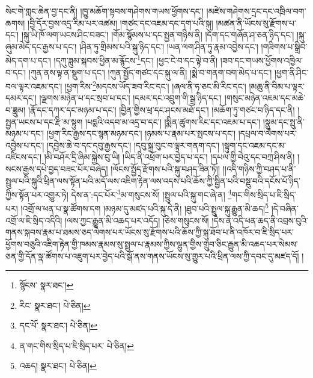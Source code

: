 སེང་གེ་གླང་ཆེན་བྱ་དང་ནི། །ཁྱུ་མཆོག་སྟབས་གཤེགས་གཡས་ཕྱོགས་དང་། །མཛེས་གཤེགས་དྲང་དང་འཁྲིལ་བག་ཆགས། །བྱི་དོར་བྱས་འདྲ་རིམ་པར་འཚམ། །གཙང་དང་འཇམ་དང་དག་པའི་སྐུ། །མཚན་ནི་ཡོངས་སུ་རྫོགས་པ་དང་། །སྐུ་ཡི་ཁོ་ལག་ཡངས་ཤིང་བཟང་། །གོམ་སྙོམས་པ་དང་སྤྱན་གཉིས་ནི། །དག་དང་གཞོན་ཤ་ཅན་ཉིད་དང་། །སྐུ་ཞུམ་མེད་དང་རྒྱས་པ་དང་། །ཤིན་ཏུ་གྲིམས་པའི་སྐུ་ཉིད་དང་། །ཡན་ལག་ཤིན་ཏུ་རྣམ་འབྱེས་དང་། །གཟིགས་པ་སྒྲིབ་མེད་དག་པ་དང་། །དཀུ་ཟླུམ་སྐབས་ཕྱིན་མ་རྙོངས་\footnote{སྙོངས་  སྣར་ཐང་། }དང་། །ཕྱང་ངེ་བ་དང་ལྟེ་བ་ནི། །ཟབ་དང་གཡས་ཕྱོགས་འཁྱིལ་བ་དང་། །ཀུན་ནས་ལྟ་ན་སྡུག་པ་དང་། །ཀུན་སྤྱོད་གཙང་དང་སྐུ་ལ་ནི། །སྨེ་བ་གནག་བག་མེད་པ་དང་། །ཕྱག་ནི་ཤིང་བལ་ལྟར་འཇམ་དང་། །ཕྱག་རིས་\footnote{རིང་  སྣར་ཐང་།  པེ་ཅིན། }མདངས་ཡོད་ཟབ་རིང་དང་། །ཞལ་ནི་ཧ་ཅང་མི་རིང་དང་། །མཆུ་ནི་བིམ་པ་ལྟར་དམར་དང་། །ལྗགས་མཉེན་པ་དང་སྲབ་པ་དང་། །དམར་དང་འབྲུག་གི་སྒྲ་ཉིད་དང་། །གསུང་མཉེན་འཇམ་དང་མཆེ་བ་ཟླུམ། །རྣོ་དང་དཀར་དང་མཉམ་པ་དང་། །བྱིན་གྱིས་ཕྲ་དང་ཤངས་མཐོ་དང་། །མཆོག་ཏུ་གཙང་བ་ཉིད་དང་ནི། །སྤྱན་ཡངས་པ་དང་རྫི་མ་སྟུག །པདྨའི་འདབ་མ་འདྲ་བ་དང་། །སྨིན་ཚུགས་རིང་དང་འཇམ་པ་དང་། །སྣུམ་དང་སྤུ་ནི་མཉམ་པ་དང་། །ཕྱག་རིང་རྒྱས་དང་སྙན་མཉམ་དང་། །ཉམས་པ་རྣམ་པར་སྤངས་པ་དང་། །དཔྲལ་བ་ལེགས་པར་འབྱེས་པ་དང་། །དབྱེས་ཆེ་བ་དང་དབུ་རྒྱས་དང་། །དབུ་སྐྲ་བུང་བ་ལྟར་གནག་དང་། །སྟུག་དང་འཇམ་དང་མ་འཛིངས་དང་། །མི་བཤོར་དྲི་ཞིམ་སྐྱེས་བུ་ཡི། །ཡིད་ནི་འཕྲོག་པར་བྱེད་པ་དང་། །དཔལ་གྱི་བེའུ་དང་བཀྲ་ཤིས་ནི། །སངས་རྒྱས་དཔེ་བྱད་བཟང་པོར་བཞེད། །ལོངས་སྤྱོད་རྫོགས་པའི་སྐུ་བཤད་ཟིན་ཏོ།། །།འདི་གཉིས་ཀྱི་བཤད་པ་ནི་སྤྲུལ་པའི་སྐུའི་ཕྲིན་ལས་སྟོན་པའི་མདོ་ལས་འཇིག་རྟེན་ལས་འདས་པའི་ཆོས་ཀྱི་སྦྱིན་པའི་བསྡུ་བའི་དངོས་པོ་ཉིད་ཀྱིས་སྟོན་པར་འགྱུར་ཏེ། དེས་ན་:དང་པོར་\footnote{དང་པོ་  སྣར་ཐང་།  པེ་ཅིན། }མ་གསུངས་སོ། །སྤྲུལ་པའི་སྐུ་གང་ཞེ་ན། \footnote{ན་གང་གིས་སྲིད་པ་ཇི་སྲིད་པར་  པེ་ཅིན། }གང་གིས་སྲིད་པ་ཇི་སྲིད་པར། །འགྲོ་ལ་ཕན་པ་སྣ་ཚོགས་དག །མཉམ་དུ་མཛད་པའི་སྐུ་དེ་ནི། །ཐུབ་པའི་སྤྲུལ་སྐུ་རྒྱུན་མི་ཆད།\footnote{འཆད།  སྣར་ཐང་།  པེ་ཅིན། } །དེ་བཞིན་འགྲོ་ལ་ཇི་སྲིད་འདིའི། །ལས་ཀྱང་རྒྱུན་མི་འཆད་པར་འདོད། །ཅེས་གསུངས་སོ། །དེས་ན་འདི་ཕན་ཆད་ནི་འབྲས་བུའི་གནས་སྐབས་རྣམ་པ་ཐམས་ཅད་ལེགས་པར་ཡོངས་སུ་རྫོགས་པའི་ཆོས་ཀྱི་སྐུ་ཐོབ་པ་ནི་འཁོར་བ་ཇི་སྲིད་པར་ཕྱོགས་བཅུའི་འཇིག་རྟེན་གྱི་ཁམས་རྣམས་སུ་སྤྲུལ་པ་རྣམས་ཀྱིས་ལྷུན་གྱིས་གྲུབ་ཅིང་རྒྱུན་མི་འཆད་པར་སེམས་ཅན་གྱི་དོན་སྣ་ཚོགས་པ་འཇུག་པར་བྱེད་པའི་སྒོ་ནས་གནས་ཡོངས་སུ་གྱུར་པའི་ཕྲིན་ལས་ཀྱི་དབང་དུ་མཛད་དོ། །
